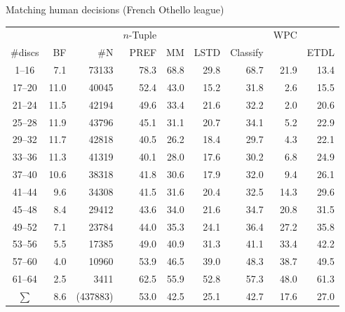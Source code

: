 \documentclass[compress]{beamer}
\begin{document}
\begin{frame}{Matching human decisions (French Othello league)}

{\footnotesize
\vspace{-.5cm}
\begin{tabular}{|c|rr|rrrr|rr|}
\hline
& & & $n$-Tuple & & &  & WPC & \\
\#discs & BF & \#N    & PREF & MM & LSTD  & Classify & & ETDL \\\hline
 1--16 & 7.1 & 73133   &  78.3  & 68.8 & 29.8 & 68.7 & 21.9 & 13.4\\ 
17--20 & 11.0 & 40045  & 52.4  & 43.0 & 15.2 & 31.8 & 2.6 & 15.5\\ 
21--24 & 11.5 & 42194  & 49.6  & 33.4 & 21.6 & 32.2 & 2.0 & 20.6\\ 
25--28 & 11.9 & 43796  & 45.1  & 31.1 & 20.7 & 34.1 & 5.2 & 22.9\\ 
29--32 & 11.7 & 42818  & 40.5  & 26.2 & 18.4 & 29.7 & 4.3 & 22.1\\ 
33--36 & 11.3 & 41319  & 40.1  & 28.0 & 17.6 & 30.2 & 6.8 & 24.9\\ 
37--40 & 10.6 & 38318  & 41.8  & 30.6 & 17.9 & 32.0 & 9.4 & 26.1\\ 
41--44 & 9.6 & 34308  & 41.5  & 31.6 & 20.4 & 32.5 & 14.3 & 29.6\\ 
45--48 & 8.4 & 29412  & 43.6  & 34.0 & 21.6 & 34.7 & 20.8 & 31.5\\ 
49--52 & 7.1 & 23784  & 44.0  & 35.3 & 24.1 & 36.4 & 27.2 & 35.8\\ 
53--56 & 5.5 & 17385  & 49.0  & 40.9 & 31.3 & 41.1 & 33.4 & 42.2\\ 
57--60 & 4.0 & 10960  & 53.9  & 46.5 & 39.0 & 48.3 & 38.7 & 49.5\\ 
61--64 & 2.5 & 3411   & 62.5  & 55.9 & 52.8  & 57.3 & 48.0 & 61.3\\ \hline
$\sum$ & 8.6 & (437883)  & 53.0  & 42.5 & 25.1 & 42.7 & 17.6 & 27.0  \\  
\hline 
\end{tabular}}


\end{frame}
\end{document}
